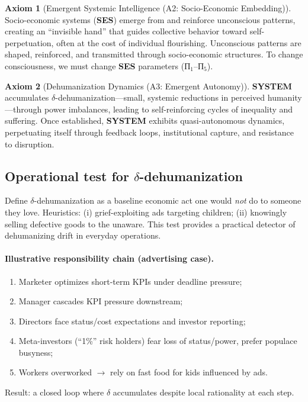 \documentclass[11pt,a4paper]{article}
\newcommand{\SYSTEM}{\textbf{SYSTEM}}
\newcommand{\SES}{\textbf{SES}}
\newcommand{\deltaDehum}{$\delta$-dehumanization}
\theoremstyle{definition}
\newtheorem{axiom}{Axiom}[section]
\theoremstyle{remark}
\begin{document}
\begin{axiom}[Emergent Systemic Intelligence (A2: Socio-Economic Embedding)]
\label{ax:emergence}
Socio-economic systems (\SES{}) emerge from and reinforce unconscious patterns, creating an ``invisible hand'' that guides collective behavior toward self-perpetuation, often at the cost of individual flourishing. Unconscious patterns are shaped, reinforced, and transmitted through socio-economic structures. To change consciousness, we must change \SES{} parameters (П$_1$--П$_5$).
\end{axiom}

\begin{axiom}[Dehumanization Dynamics (A3: Emergent Autonomy)]
\label{ax:dehumanization}
\SYSTEM{} accumulates \deltaDehum{}---small, systemic reductions in perceived humanity---through power imbalances, leading to self-reinforcing cycles of inequality and suffering. Once established, \SYSTEM{} exhibits quasi-autonomous dynamics, perpetuating itself through feedback loops, institutional capture, and resistance to disruption.
\end{axiom}

\subsection{Operational test for $\delta$-dehumanization}
\label{subsec:delta_test}

Define $\delta$-dehumanization as a baseline economic act one would \emph{not} do to someone they love. Heuristics: (i) grief-exploiting ads targeting children; (ii) knowingly selling defective goods to the unaware. This test provides a practical detector of dehumanizing drift in everyday operations. %

\paragraph{Illustrative responsibility chain (advertising case).}
\begin{enumerate}\itemsep0.2em
\item Marketer optimizes short-term KPIs under deadline pressure;
\item Manager cascades KPI pressure downstream;
\item Directors face status/cost expectations and investor reporting;
\item Meta-investors (``1\%'' risk holders) fear loss of status/power, prefer populace busyness;
\item Workers overworked $\rightarrow$ rely on fast food for kids influenced by ads.
\end{enumerate}
Result: a closed loop where $\delta$ accumulates despite local rationality at each step. %
\end{document}
